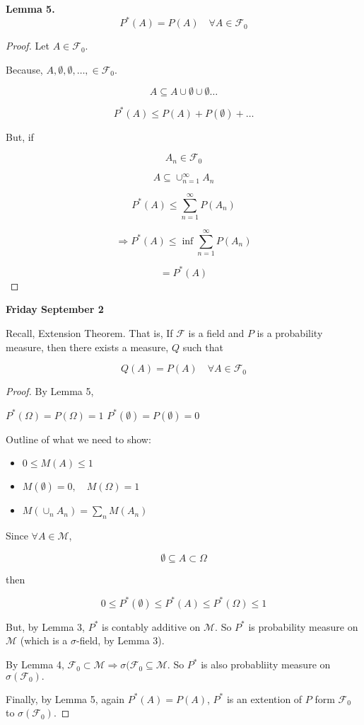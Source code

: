 \documentclass[11pt,fleqn]{book} %
\begin{document}
\textbf{Lemma 5.}$$P^*(A) = P(A) \quad \forall A \in \mathscr{F}_0$$

\begin{proof}
	Let $A \in \mathscr{F}_0$. 

	Because,  $A, \emptyset, \emptyset, \dots, \in \mathscr{F}_0$. 

	$$A \subseteq A \cup \emptyset \cup \emptyset \dots $$

	$$P^*(A) \leq P(A) + P(\emptyset) + \dots $$

But, if 

$$A_n \in \mathscr{F}_0$$

$$A \subseteq \cup^\infty_{n=1} A_n $$

$$P^*(A) \leq \displaystyle \sum^\infty_{n=1} P(A_n)$$

$$\Rightarrow P^*(A) \leq \inf \displaystyle \sum^\infty_{n=1} P(A_n) $$

$$ = P^*(A)$$
\end{proof}

\textbf{Friday September 2}

Recall, Extension Theorem. That is, If $\mathscr{F}$ is a field and $P$ is a probability measure, then there exists a measure, $Q$ such that 

	$$Q(A) =  P(A) \quad \forall A \in \mathscr{F}_0$$

\begin{proof}
	By Lemma 5, 

	$P^*(\Omega) = P(\Omega) = 1$
	$P^*(\emptyset) = P(\emptyset) = 0$

	Outline of what we need to show:

	\begin{itemize}
		\item $ 0 \leq M(A) \leq 1$
		\item $M(\emptyset) = 0, \quad M(\Omega)=1$
		\item $M(\cup_n A_n) = \sum_n M(A_n)$
	\end{itemize}

	Since $\forall A \in \mathscr{M}$, 

	$$\emptyset \subseteq A \subset \Omega $$

	then 

	$$ 0 \leq P^*(\emptyset) \leq P^*(A) \leq P^*(\Omega) \leq 1$$

	But, by Lemma 3, $P^*$ is contably additive on $\mathscr{M}$. So $P^*$ is probability measure on $\mathscr{M}$ (which is a $\sigma$-field, by Lemma 3).

	By Lemma 4, $\mathscr{F}_0 \subset \mathscr{M} \Rightarrow \sigma(\mathscr{F}_0 \subseteq \mathscr{M}$. So $P^*$ is also probabliity measure on $\sigma(\mathscr{F}_0).$

	Finally, by Lemma 5, again $P^*(A) = P(A)$, $P^*$ is an extention of $P$ form $\mathscr{F}_0$  to $\sigma(\mathscr{F}_0)$. 
\end{proof}
\end{document}

